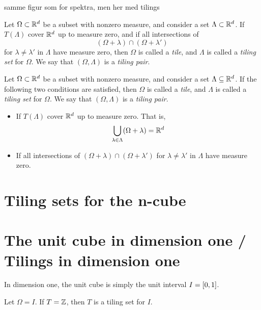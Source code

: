 \documentclass[../thesis.tex]{subfiles}
\begin{document}

samme figur som for spektra, men her med tilings



\clearpage
{}
\begin{definition}
    Let $\Omega \subset \mathbb{R}^d$ be a subset with nonzero measure, and consider a set $\Lambda \subset \mathbb{R}^d$. If $T(\Lambda)$ cover $\mathbb{R}^d$ up to measure zero, and if all intersections of 
    \begin{equation*}  %
        (\Omega+\lambda) \cap (\Omega+\lambda')
    \end{equation*}
    for $\lambda\neq \lambda'$ in $\Lambda$ have measure zero, then $\Omega$ is called a \emph{tile}, and $\Lambda$ is called a \emph{tiling set} for $\Omega$. We say that $(\Omega, \Lambda)$ is a \emph{tiling pair}. 
\end{definition}
\begin{definition}
    Let $\Omega \subset \mathbb{R}^d$ be a subset with nonzero measure, and consider a set $\Lambda \subseteq \mathbb{R}^d$. If the following two conditions are satisfied, then $\Omega$ is called a \emph{tile}, and $\Lambda$ is called a \emph{tiling set} for $\Omega$. We say that $(\Omega, \Lambda)$ is a \emph{tiling pair}. 
    \begin{itemize}
        \item If $T(\Lambda)$ cover $\mathbb{R}^d$ up to measure zero. That is,  %
        \begin{equation*}
            \bigcup_{\lambda \in \Lambda} (\Omega + \lambda) = \mathbb{R}^d
        \end{equation*}
        \item If all intersections of $(\Omega+\lambda) \cap (\Omega+\lambda')$ for $\lambda\neq \lambda'$ in $\Lambda$ have measure zero. %
    \end{itemize}
\end{definition}


\section{Tiling sets for the n-cube}
\section{The unit cube in dimension one / Tilings in dimension one}
In dimension one, the unit cube is simply the unit interval $I=[0,1]$.
\begin{theorem}  %
    Let $\Omega = I$. If $T=\mathbb{Z}$, then $T$ is a tiling set for $I$.
\end{theorem}
\end{document}
